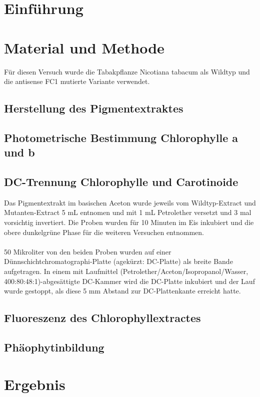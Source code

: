 \documentclass[10pt,a4paper]{article}
\begin{document}
	
	\section{Einführung}
	

	
	\section{Material und Methode}
	Für diesen Versuch wurde die Tabakpflanze Nicotiana tabacum als Wildtyp und die antisense FC1 mutierte Variante verwendet.
		\subsection{Herstellung des Pigmentextraktes}
		\subsection{Photometrische Bestimmung Chlorophylle a und b}
		\subsection{DC-Trennung Chlorophylle und Carotinoide}
		Das Pigmentextrakt im basischen Aceton wurde jeweils vom Wildtyp-Extract und Mutanten-Extract 5 mL entnomen und mit 1 mL Petrolether versetzt und 3 mal vorsichtig invertiert.
		Die Proben wurden für 10 Minuten im Eis inkubiert und die obere dunkelgrüne Phase für die weiteren Versuchen entnommen.\\
		\\
		50 Mikroliter von den beiden Proben wurden auf einer Dünnschichtchromatographi-Platte (agekürzt: DC-Platte) als breite Bande aufgetragen.
		In einem mit Laufmittel (Petrolether/Aceton/Isopropanol/Wasser, 400:80:48:1)-abgesättigte DC-Kammer wird die DC-Platte inkubiert und der Lauf wurde gestoppt, als diese 5 mm Abstand zur DC-Plattenkante erreicht hatte.
		\subsection{Fluoreszenz des Chlorophyllextractes}
		\subsection{Phäophytinbildung}
	
	\section{Ergebnis}
\end{document}
